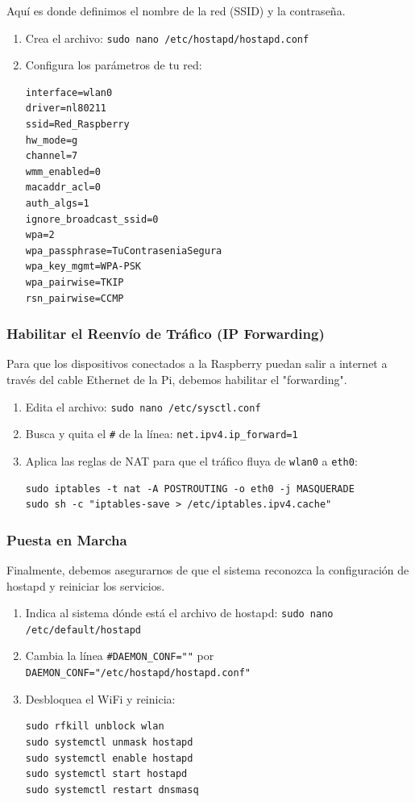 Aquí es donde definimos el nombre de la red (SSID) y la contraseña.

\begin{enumerate}
	\item Crea el archivo: \texttt{sudo nano /etc/hostapd/hostapd.conf}
	\item Configura los parámetros de tu red:
\begin{lstlisting}
interface=wlan0
driver=nl80211
ssid=Red_Raspberry
hw_mode=g
channel=7
wmm_enabled=0
macaddr_acl=0
auth_algs=1
ignore_broadcast_ssid=0
wpa=2
wpa_passphrase=TuContraseniaSegura
wpa_key_mgmt=WPA-PSK
wpa_pairwise=TKIP
rsn_pairwise=CCMP
\end{lstlisting}
\end{enumerate}

\subsubsection{Habilitar el Reenvío de Tráfico (IP Forwarding)}

Para que los dispositivos conectados a la Raspberry puedan salir a internet a través del cable Ethernet de la Pi, debemos habilitar el "forwarding".

\begin{enumerate}
	\item Edita el archivo: \texttt{sudo nano /etc/sysctl.conf}
	\item Busca y quita el \texttt{\#} de la línea: \texttt{net.ipv4.ip\_forward=1}
	\item Aplica las reglas de NAT para que el tráfico fluya de
		\texttt{wlan0} a \texttt{eth0}:
\begin{lstlisting}
sudo iptables -t nat -A POSTROUTING -o eth0 -j MASQUERADE
sudo sh -c "iptables-save > /etc/iptables.ipv4.cache"
\end{lstlisting}
\end{enumerate}

\subsubsection{Puesta en Marcha}

Finalmente, debemos asegurarnos de que el sistema reconozca la
configuración de hostapd y reiniciar los servicios.

\begin{enumerate}
	\item Indica al sistema dónde está el archivo de hostapd:
			\texttt{sudo nano /etc/default/hostapd}
	\item Cambia la línea \texttt{\#DAEMON\_CONF=""} por
			\texttt{DAEMON\_CONF="/etc/hostapd/hostapd.conf"}
	\item Desbloquea el WiFi y reinicia:
\begin{lstlisting}
sudo rfkill unblock wlan
sudo systemctl unmask hostapd
sudo systemctl enable hostapd
sudo systemctl start hostapd
sudo systemctl restart dnsmasq
\end{lstlisting}
\end{enumerate}

